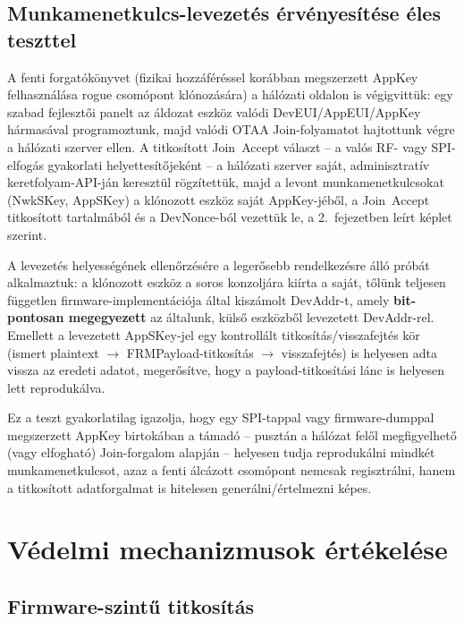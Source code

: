 \documentclass[12pt,a4paper]{article}
\begin{document}
\subsection{Munkamenetkulcs-levezetés érvényesítése éles teszttel}

A fenti forgatókönyvet (fizikai hozzáféréssel korábban megszerzett AppKey
felhasználása rogue csomópont klónozására) a hálózati oldalon is
végigvittük: egy szabad fejlesztői panelt az áldozat eszköz valódi
DevEUI/AppEUI/AppKey hármasával programoztunk, majd valódi OTAA
Join-folyamatot hajtottunk végre a hálózati szerver ellen. A titkosított
Join~Accept választ -- a valós RF- vagy SPI-elfogás gyakorlati
helyettesítőjeként -- a hálózati szerver saját, adminisztratív
keretfolyam-API-ján keresztül rögzítettük, majd a levont munkamenetkulcsokat
(NwkSKey, AppSKey) a klónozott eszköz saját AppKey-jéből, a Join~Accept
titkosított tartalmából és a DevNonce-ból vezettük le, a
2.\ fejezetben leírt képlet szerint.

A levezetés helyességének ellenőrzésére a legerősebb rendelkezésre álló
próbát alkalmaztuk: a klónozott eszköz a soros konzoljára kiírta a saját,
tőlünk teljesen független firmware-implementációja által kiszámolt
DevAddr-t, amely \textbf{bit-pontosan megegyezett} az általunk, külső
eszközből levezetett DevAddr-rel. Emellett a levezetett AppSKey-jel egy
kontrollált titkosítás/visszafejtés kör (ismert plaintext $\to$
FRMPayload-titkosítás $\to$ visszafejtés) is helyesen adta vissza az
eredeti adatot, megerősítve, hogy a payload-titkosítási lánc is helyesen
lett reprodukálva.

Ez a teszt gyakorlatilag igazolja, hogy egy SPI-tappal vagy firmware-dumppal
megszerzett AppKey birtokában a támadó -- pusztán a hálózat felől
megfigyelhető (vagy elfogható) Join-forgalom alapján -- helyesen tudja
reprodukálni mindkét munkamenetkulcsot, azaz a fenti álcázott csomópont
nemcsak regisztrálni, hanem a titkosított adatforgalmat is hitelesen
generálni/értelmezni képes.

\section{Védelmi mechanizmusok értékelése}

\subsection{Firmware-szintű titkosítás}
\end{document}
